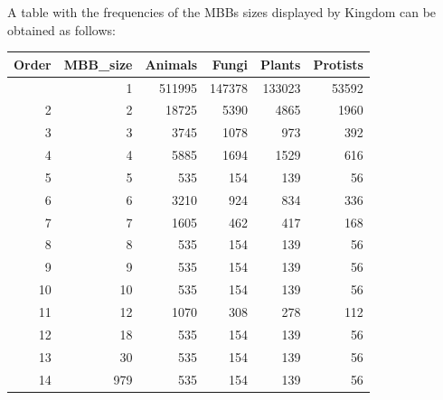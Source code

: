 \documentclass[
  letterpaper,
  DIV=11,
  numbers=noendperiod]{scrreprt}
\newenvironment{Shaded}{}{}
\newcommand{\AttributeTok}[1]{\textcolor[rgb]{0.78,0.47,0.87}{#1}}
\newcommand{\DecValTok}[1]{\textcolor[rgb]{0.82,0.60,0.40}{#1}}
\newcommand{\FunctionTok}[1]{\textcolor[rgb]{0.38,0.69,0.94}{#1}}
\newcommand{\NormalTok}[1]{\textcolor[rgb]{0.67,0.70,0.75}{#1}}
\newcommand{\OtherTok}[1]{\textcolor[rgb]{0.15,0.68,0.38}{#1}}
\newcommand{\SpecialCharTok}[1]{\textcolor[rgb]{0.34,0.71,0.76}{#1}}
\begin{document}
A table with the frequencies of the MBBs sizes displayed by Kingdom can
be obtained as follows:

\begin{Shaded}
\end{Shaded}

\begin{longtable}[]{@{}rrrrrr@{}}
\toprule\noalign{}
Order & MBB\_size & Animals & Fungi & Plants & Protists \\
\midrule\noalign{}
\endhead
\bottomrule\noalign{}
\endlastfoot
1 & 1 & 511995 & 147378 & 133023 & 53592 \\
2 & 2 & 18725 & 5390 & 4865 & 1960 \\
3 & 3 & 3745 & 1078 & 973 & 392 \\
4 & 4 & 5885 & 1694 & 1529 & 616 \\
5 & 5 & 535 & 154 & 139 & 56 \\
6 & 6 & 3210 & 924 & 834 & 336 \\
7 & 7 & 1605 & 462 & 417 & 168 \\
8 & 8 & 535 & 154 & 139 & 56 \\
9 & 9 & 535 & 154 & 139 & 56 \\
10 & 10 & 535 & 154 & 139 & 56 \\
11 & 12 & 1070 & 308 & 278 & 112 \\
12 & 18 & 535 & 154 & 139 & 56 \\
13 & 30 & 535 & 154 & 139 & 56 \\
14 & 979 & 535 & 154 & 139 & 56 \\
\end{longtable}
\end{document}
